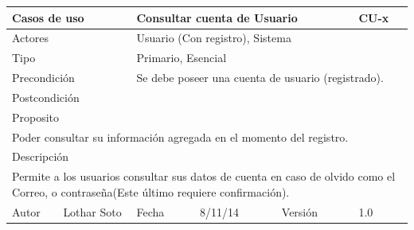 \documentclass{article}
\begin{document}
\begin{table}[h]
\begin{tabular}{|l|l|l|l|l|l|}
\hline
\multicolumn{2}{|p{2cm}|}{Casos de uso}  & \multicolumn{3}{p{7cm}|}{\textbf{Consultar cuenta de Usuario}} & CU-x \\
\hline
\multicolumn{2}{|p{2cm}|}{Actores}       & \multicolumn{4}{p{8cm}|}{Usuario (Con registro), Sistema}        \\
\hline
\multicolumn{2}{|p{2cm}|}{Tipo}          & \multicolumn{4}{p{8cm}|}{Primario, Esencial}        \\
\hline
\multicolumn{2}{|p{2cm}|}{Precondición}  & \multicolumn{4}{p{8cm}|}{Se debe poseer una cuenta de usuario (registrado).}        \\
\hline
\multicolumn{2}{|p{2cm}|}{Postcondición} & \multicolumn{4}{p{8cm}|}{}        \\
\hline
\multicolumn{6}{|p{10cm}|}{Proposito}                                   \\
\hline
\multicolumn{6}{|p{10cm}|}{Poder consultar su información agregada en el momento del registro.}                                            \\
\hline
\multicolumn{6}{|p{10cm}|}{Descripción}                                 \\
\hline
\multicolumn{6}{|p{10cm}|}{Permite a los usuarios consultar sus datos de cuenta en caso de olvido como el Correo, o contraseña(Este último requiere confirmación).}                                            \\
\hline
Autor             &     Lothar Soto          & Fecha    &  8/11/14   &   Versión  &1.0\\     
\hline
\end{tabular}
\end{table}
\end{document}
